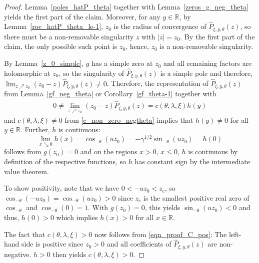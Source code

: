 \documentclass[12pt]{article}
\newcommand{\R}{\mathbb{R}} %
\newcommand{\1}{\mathds{1}}
\theoremstyle{definition}
\theoremstyle{plain}
\theoremstyle{remark}
\begin{document}
\begin{proof}
   Lemma~\ref{poles_hatP_theta} together with Lemma~\ref{zeros_g_neg_theta} yields the first part of the claim. Moreover, for any $y\in\R$, by Lemma~\ref{roc_hatP_theta_le-1}, $z_0$ is the radius of convergence of $\hat{P}_{\xi,y,\theta}(z)$, so there must be a non-removable singularity $z$ with $|z|=z_0$. By the first part of the claim, the only possible such point is $z_0$, hence, $z_0$ is a non-removable singularity. 
   
   By Lemma~\ref{z_0_simple}, $g$ has a simple zero at $z_0$ and all remaining factors are holomorphic at $z_0$, so the singularity of $\hat{P}_{\xi,y,\theta}(z)$ is a simple pole and therefore, $\lim_{z\nearrow z_0}(z_0-z)\hat{P}_{\xi,y,\theta}(z)\ne 0$. Therefore, the representation of $\hat{P}_{\xi,y,\theta}(z)$ from Lemma~\ref{gf_neg_theta} or Corollary~\ref{gf_theta-1} together with
   \begin{align}\label{eqn_proof_C_pos}
       0\ne \lim_{z\nearrow z_0}(z_0-z)\hat{P}_{\xi,y,\theta}(z)=c(\theta,\lambda,\xi)h(y)
   \end{align}
    and $c(\theta,\lambda,\xi)\ne 0$ from \eqref{c_non_zero_negtheta} implies that $h(y)\neq 0$ for all $y\in\R$.  
    Further, $h$ is continuous: $$\lim_{x\searrow 0}h(x)=\cos_{-\theta}\left(u z_0\right)=-\gamma^{1/2}\sin_{-\theta}\left(u z_0\right)=h(0)$$ follows from $g(z_0)=0$ and on the regions $x>0$, $x\le 0$, $h$ is continuous by definition of the respective functions, so $h$ has constant sign by the intermediate value theorem. 
    
    To show positivity, note that we have $0<-u{z_0}<z_c$, so $\cos_{-\theta}(-u{z_0})=\cos_{-\theta}(u{z_0})> 0$ since $z_c$ is the smallest positive real zero of $\cos_{-\theta}$ and $\cos_{-\theta}(0)=1$. With $g(z_0)=0$, this yields $\sin_{-\theta}(u{z_0})<0$ and thus, $h(0)>0$ which implies $h(x)>0$ for all $x\in\R$.
    
    The fact that $c(\theta,\lambda,\xi)>0$ now follows from \eqref{eqn_proof_C_pos}: The left-hand side is positive since $z_0>0$ and all coefficients of $\hat{P}_{\xi,y,\theta}(z)$ are non-negative. $h>0$ then yields $c(\theta,\lambda,\xi)>0$.
\end{proof}
\end{document}
